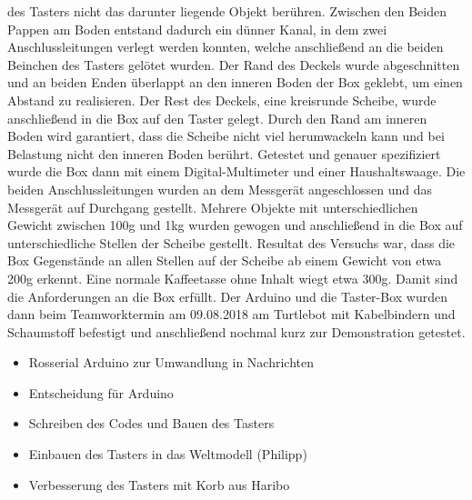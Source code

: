 \documentclass[a4paper,12pt,headsepline]{scrartcl}
\begin{document}
des Tasters nicht das darunter liegende Objekt berühren. Zwischen den Beiden Pappen am Boden entstand dadurch ein dünner Kanal, in dem zwei Anschlussleitungen verlegt werden konnten, welche anschließend an die beiden Beinchen des Tasters gelötet wurden. Der Rand des Deckels wurde abgeschnitten und an beiden Enden überlappt an den inneren Boden der Box geklebt, um einen Abstand zu realisieren. Der Rest des Deckels, eine kreisrunde Scheibe, wurde anschließend in die Box auf den Taster gelegt. Durch den Rand am inneren Boden wird garantiert, dass die Scheibe nicht viel herumwackeln kann und bei Belastung nicht den inneren Boden berührt. Getestet und genauer spezifiziert wurde die Box dann mit einem Digital-Multimeter und einer Haushaltswaage. Die beiden Anschlussleitungen wurden an dem Messgerät angeschlossen und das Messgerät auf Durchgang gestellt. Mehrere Objekte mit unterschiedlichen Gewicht zwischen 100g und 1kg wurden gewogen und anschließend in die Box auf unterschiedliche Stellen der Scheibe gestellt. Resultat des Versuchs war, dass die Box Gegenstände an allen Stellen auf der Scheibe ab einem Gewicht von etwa 200g erkennt. Eine normale Kaffeetasse ohne Inhalt wiegt etwa 300g. Damit sind die Anforderungen an die Box erfüllt. Der Arduino und die Taster-Box wurden dann beim Teamworktermin am 09.08.2018 am Turtlebot mit Kabelbindern und Schaumstoff befestigt und anschließend nochmal kurz zur Demonstration getestet.
		\begin{itemize}
			\item Rosserial Arduino zur Umwandlung in Nachrichten
			\item Entscheidung für Arduino
			\item Schreiben des Codes und Bauen des Tasters
			\item Einbauen des Tasters in das Weltmodell (Philipp)
			\item Verbesserung des Tasters mit Korb aus Haribo
		\end{itemize}
	
\end{document}
